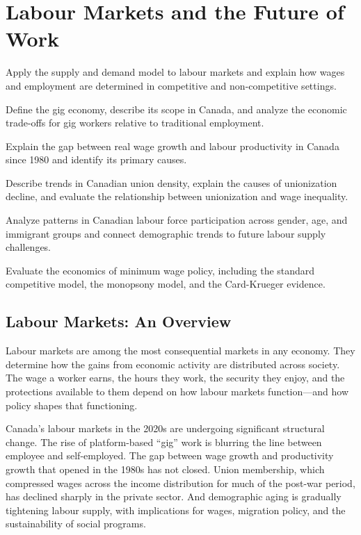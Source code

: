 
\chapter{Labour Markets and the Future of Work}
\label{ch:labour}

\begin{learningobjectives}
\item Apply the supply and demand model to labour markets and explain how wages and employment are determined in competitive and non-competitive settings.
\item Define the gig economy, describe its scope in Canada, and analyze the economic trade-offs for gig workers relative to traditional employment.
\item Explain the gap between real wage growth and labour productivity in Canada since 1980 and identify its primary causes.
\item Describe trends in Canadian union density, explain the causes of unionization decline, and evaluate the relationship between unionization and wage inequality.
\item Analyze patterns in Canadian labour force participation across gender, age, and immigrant groups and connect demographic trends to future labour supply challenges.
\item Evaluate the economics of minimum wage policy, including the standard competitive model, the monopsony model, and the Card-Krueger evidence.
\end{learningobjectives}

\section{Labour Markets: An Overview}

Labour markets are among the most consequential markets in any economy. They determine how the gains from economic activity are distributed across society. The wage a worker earns, the hours they work, the security they enjoy, and the protections available to them depend on how labour markets function---and how policy shapes that functioning.

Canada's labour markets in the 2020s are undergoing significant structural change. The rise of platform-based ``gig'' work is blurring the line between employee and self-employed. The gap between wage growth and productivity growth that opened in the 1980s has not closed. Union membership, which compressed wages across the income distribution for much of the post-war period, has declined sharply in the private sector. And demographic aging is gradually tightening labour supply, with implications for wages, migration policy, and the sustainability of social programs.

